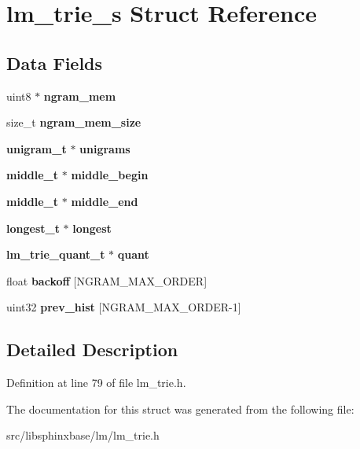 \section{lm\-\_\-trie\-\_\-s Struct Reference}
\label{structlm__trie__s}
\subsection*{Data Fields}
\begin{DoxyCompactItemize}
\item 
uint8 $\ast$ {\bfseries ngram\-\_\-mem}\label{structlm__trie__s_a58167a5c232538cebd3e083a097a9a1b}

\item 
size\-\_\-t {\bfseries ngram\-\_\-mem\-\_\-size}\label{structlm__trie__s_af256466f3eff8c3b665f10200815ba1d}

\item 
{\bf unigram\-\_\-t} $\ast$ {\bfseries unigrams}\label{structlm__trie__s_a22667bd186be6bf3804a3a597c96bd93}

\item 
{\bf middle\-\_\-t} $\ast$ {\bfseries middle\-\_\-begin}\label{structlm__trie__s_aa4a224213e7c1f5fcdb8b15169c237de}

\item 
{\bf middle\-\_\-t} $\ast$ {\bfseries middle\-\_\-end}\label{structlm__trie__s_a7f39ce792b398ba89e5db14a895189e9}

\item 
{\bf longest\-\_\-t} $\ast$ {\bfseries longest}\label{structlm__trie__s_ade570f476da0d4fb1d865a7eb4285a3b}

\item 
{\bf lm\-\_\-trie\-\_\-quant\-\_\-t} $\ast$ {\bfseries quant}\label{structlm__trie__s_a0a25fcb4269d21eba7596524b4f39bbd}

\item 
float {\bfseries backoff} [N\-G\-R\-A\-M\-\_\-\-M\-A\-X\-\_\-\-O\-R\-D\-E\-R]\label{structlm__trie__s_a467064aa205c77cd01be1d3a4fdd1e6d}

\item 
uint32 {\bfseries prev\-\_\-hist} [N\-G\-R\-A\-M\-\_\-\-M\-A\-X\-\_\-\-O\-R\-D\-E\-R-\/1]\label{structlm__trie__s_af5fc87e3db91813012f217c1eabf286c}

\end{DoxyCompactItemize}


\subsection{Detailed Description}


Definition at line 79 of file lm\-\_\-trie.\-h.



The documentation for this struct was generated from the following file\-:\begin{DoxyCompactItemize}
\item 
src/libsphinxbase/lm/lm\-\_\-trie.\-h\end{DoxyCompactItemize}
